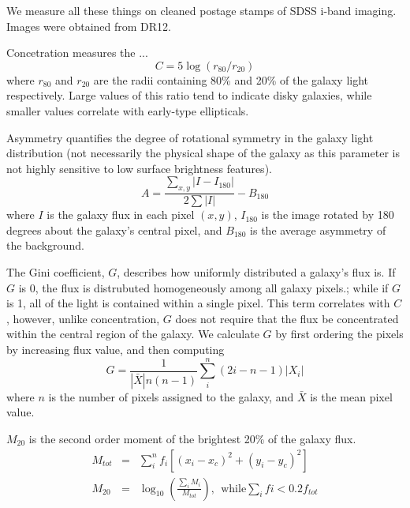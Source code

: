 \documentclass[twocolumn]{aastex6}
\newcommand{\rr}[1]{$r_{#1}$}
\newcommand{\M}[1]{$M_{#1}$}
\begin{document}
We measure all these things on cleaned postage stamps of SDSS i-band imaging. 
Images were obtained from DR12. 


Concetration measures the ... 
\begin{equation}
C = 5\log(r_{80}/ r_{20})
\end{equation}
where \rr{80} and \rr{20} are the radii containing 80\% and 20\% of the galaxy light respectively.  Large values of this ratio tend to indicate disky galaxies, while smaller values correlate with early-type ellipticals. 

Asymmetry quantifies the degree of rotational symmetry in the galaxy light distribution (not necessarily the physical shape of the galaxy as this parameter is not highly sensitive to low surface brightness features).  
\begin{equation}
A = \frac{\sum_{x,y} |I - I_{180}|}{ 2\sum|I|} - B_{180}
\end{equation}
where $I$ is the galaxy flux in each pixel $(x, y)$, $I_{180}$ is the image rotated by 180 degrees about the galaxy's central pixel, and $B_{180}$ is the average asymmetry of the background. 

The Gini coefficient, $G$, describes how uniformly distributed a galaxy's flux is.  If $G$ is 0, the flux is distrubuted homogeneously among all galaxy pixels.; while if $G$ is 1,  all of the light is contained within a single pixel. This term correlates with $C$, however, unlike concentration, $G$ does not require that the flux be concentrated within the central region of the galaxy.  We calculate $G$ by first ordering the pixels by increasing flux value, and then computing
\begin{equation}
G = \frac{1}{|\bar X|n(n-1)}\sum_i^n(2i-n-1)|X_i|
\end{equation}
where $n$ is the number of pixels assigned to the galaxy, and $\bar X$ is the mean pixel value. 

\M{20} is the second order moment of the brightest 20\% of the galaxy flux. 
\begin{eqnarray}
 M_{tot} & = & \sum_i^nf_i[(x_i-x_c)^2 + (y_i-y_c)^2]  \\
 M_{20} & = & \log_{10} (\frac{\sum_iM_i}{M_{tot}}), ~~\textrm{while} \sum_ifi < 0.2f_{tot}
\end{eqnarray}



\end{document}
